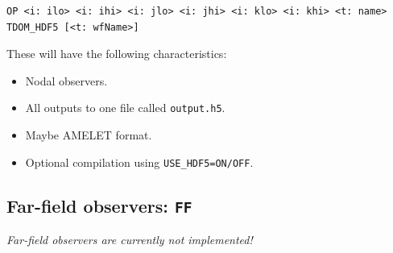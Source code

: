 \documentclass[onecolumn,a4paper]{article}
\numberwithin{equation}{section}
\begin{document}
\begin{verbatim}
OP <i: ilo> <i: ihi> <i: jlo> <i: jhi> <i: klo> <i: khi> <t: name> TDOM_HDF5 [<t: wfName>]
\end{verbatim}

These will have the following characteristics:
\begin{itemize}
 \item Nodal observers.
 \item All outputs to one file called \texttt{output.h5}.
 \item Maybe AMELET format.
 \item Optional compilation using \texttt{USE\_HDF5=ON/OFF}.
\end{itemize}

\subsection{Far-field observers: \texttt{FF}}

{\color{red}\it Far-field observers are currently not implemented!\\ \\}
\end{document}
